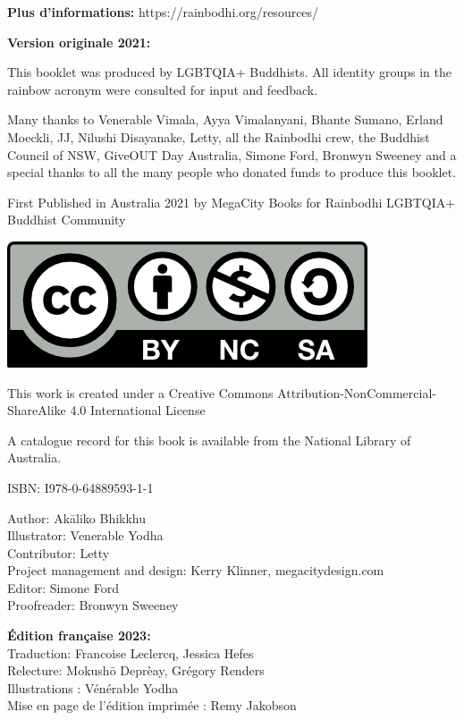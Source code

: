 \documentclass[12pt,openany]{book}
\begin{document}
\newpage
\textbf{Plus d'informations: }https://rainbodhi.org/resources/

\medskip

{\footnotesize
\begin{center}
\noindent \textbf{Version originale 2021:} 

This booklet was produced by \mbox{LGBTQIA+} Buddhists. All identity groups in the rainbow acronym were consulted for input and feedback.

\noindent Many thanks to Venerable Vimala, Ayya Vimalanyani, Bhante Sumano, Erland Moeckli, JJ, Nilushi Disayanake, Letty, all the Rainbodhi crew, the Buddhist Council of NSW, GiveOUT Day Australia, Simone Ford, Bronwyn Sweeney and a special thanks to all the many people who donated funds to produce this booklet.

\medskip

\noindent First Published in Australia 2021 by MegaCity Books for Rainbodhi \mbox{LGBTQIA+} Buddhist Community

\smallskip

\includegraphics{by-nc-sa}

\noindent This work is created under a Creative Commons Attribution-NonCommercial-ShareAlike 4.0 International License

\noindent A catalogue record for this book is available from the National Library of Australia.

\medskip

\noindent ISBN: I978-0-64889593-1-1

\medskip

Author: Akāliko Bhikkhu \\
Illustrator: Venerable Yodha \\
Contributor: Letty \\
Project management and design: Kerry Klinner, megacitydesign.com \\
Editor: Simone Ford \\
Proofreader: Bronwyn Sweeney

\bigskip

\textbf{Édition française 2023:}  \\
Traduction: Francoise Leclercq, Jessica Hefes \\
Relecture: Mokushō Deprèay, Grégory Renders \\
Illustrations : Vénérable Yodha \\
Mise en page de l'édition imprimée : Remy Jakobson
\end{center}
}
\end{document}
